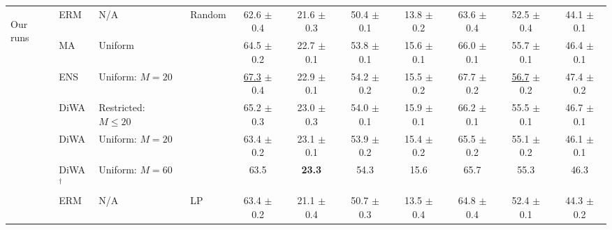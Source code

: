 \begin{table}[h]
{\begin{tabular}{llll|ccccccc}
            \midrule
            \multirow{13}{*}{\begin{turn}{90}Our runs\end{turn}}
             & ERM                                                & N/A                       & \multirow{6}{*}{Random}                        & 62.6 $\pm$ 0.4             & 21.6 $\pm$ 0.3          & 50.4 $\pm$ 0.1             & 13.8 $\pm$ 0.2             & 63.6 $\pm$ 0.4             & 52.5 $\pm$ 0.4             & 44.1 $\pm$ 0.1          \\
             & MA \cite{arpit2021ensemble}                        & Uniform                   &                                                & 64.5 $\pm$ 0.2             & 22.7 $\pm$ 0.1          & 53.8 $\pm$ 0.1             & 15.6 $\pm$ 0.1             & 66.0 $\pm$ 0.1             & 55.7 $\pm$ 0.1             & 46.4 $\pm$ 0.1          \\
             & ENS                                                & Uniform: $M=20$           &                                                & \underline{67.3} $\pm$ 0.4 & 22.9 $\pm$ 0.1          & 54.2 $\pm$ 0.2             & 15.5 $\pm$ 0.2             & 67.7 $\pm$ 0.2             & \underline{56.7} $\pm$ 0.2 & 47.4 $\pm$ 0.2          \\
             & DiWA                                               & Restricted: $M \leq 20$   &                                                & 65.2 $\pm$ 0.3             & 23.0 $\pm$ 0.3          & 54.0 $\pm$ 0.1             & 15.9 $\pm$ 0.1             & 66.2 $\pm$ 0.1             & 55.5 $\pm$ 0.1             & 46.7 $\pm$ 0.1          \\
             & DiWA                                               & Uniform: $M=20$           &                                                & 63.4 $\pm$ 0.2             & 23.1 $\pm$ 0.1          & 53.9 $\pm$ 0.2             & 15.4 $\pm$ 0.2             & 65.5 $\pm$ 0.2             & 55.1 $\pm$ 0.2             & 46.1 $\pm$ 0.1          \\
             & DiWA$^{\dagger}$                                   & Uniform: $M=60$           &                                                & 63.5                       & \textbf{23.3}           & 54.3                       & 15.6                       & 65.7                       & 55.3                       & 46.3                    \\
            \cmidrule{2-11}
             & ERM                                                & N/A                       & \multirow{7}{*}{LP \cite{kumar2022finetuning}} & 63.4 $\pm$ 0.2             & 21.1 $\pm$ 0.4          & 50.7 $\pm$ 0.3             & 13.5 $\pm$ 0.4             & 64.8 $\pm$ 0.4             & 52.4 $\pm$ 0.1             & 44.3 $\pm$ 0.2          \\

\end{tabular}}
\end{table}
